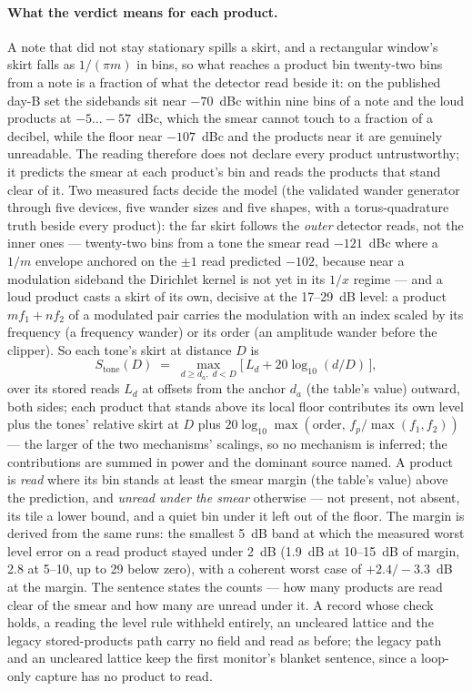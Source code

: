 \documentclass[11pt,a4paper]{article}
\begin{document}
\paragraph{What the verdict means for each product.}
\label{sec:imd-smear}
A note that did not stay stationary spills a skirt, and a rectangular
window's skirt falls as $1/(\pi m)$ in bins, so what reaches a product bin
twenty-two bins from a note is a fraction of what the detector read beside
it: on the published day-B set the sidebands sit near $-70$~dBc within nine
bins of a note and the loud products at $-5 \ldots -57$~dBc, which the
smear cannot touch to a fraction of a decibel, while the floor near
$-107$~dBc and the products near it are genuinely unreadable. The reading
therefore does not declare every product untrustworthy; it predicts the
smear at each product's bin and reads the products that stand clear of
it. Two measured facts decide the model (the validated wander generator
through five devices, five wander sizes and five shapes, with a
torus-quadrature truth beside every product): the far skirt follows the
\emph{outer} detector reads, not the inner ones --- twenty-two bins from a
tone the smear read $-121$~dBc where a $1/m$ envelope anchored on the
$\pm 1$ read predicted $-102$, because near a modulation sideband the
Dirichlet kernel is not yet in its $1/x$ regime --- and a loud product
casts a skirt of its own, decisive at the 17--29~dB level: a product
$m f_1 + n f_2$ of a modulated pair carries the modulation with an index
scaled by its frequency (a frequency wander) or its order (an amplitude
wander before the clipper). So each tone's skirt at distance $D$ is
\begin{equation}
  S_{\mathrm{tone}}(D) \;=\; \max_{d \ge d_a,\; d < D}\big[\,L_d + 20\log_{10}(d/D)\,\big],
  \label{eq:smear}
\end{equation}
over its stored reads $L_d$ at offsets from the anchor $d_a$ (the table's
value) outward, both sides; each product that stands above its local floor
contributes its own level plus the tones' relative skirt at $D$ plus
$20\log_{10}\max(\mathrm{order},\, f_p / \max(f_1, f_2))$ --- the larger
of the two mechanisms' scalings, so no mechanism is inferred; the
contributions are summed in power and the dominant source named. A
product is \emph{read} where its bin stands at least the smear margin
(the table's value) above the prediction, and \emph{unread under the
smear} otherwise --- not present, not absent, its tile a lower bound, and
a quiet bin under it left out of the floor. The margin is derived from
the same runs: the smallest 5~dB band at which the measured worst level
error on a read product stayed under 2~dB (1.9~dB at 10--15~dB of
margin, 2.8 at 5--10, up to 29 below zero), with a coherent worst case of
$+2.4 / -3.3$~dB at the margin. The sentence states the counts --- how
many products are read clear of the smear and how many are unread under
it. A record whose check holds, a reading the level rule withheld
entirely, an uncleared lattice and the legacy stored-products path carry
no field and read as before; the legacy path and an uncleared lattice
keep the first monitor's blanket sentence, since a loop-only capture has
no product to read.
\end{document}
